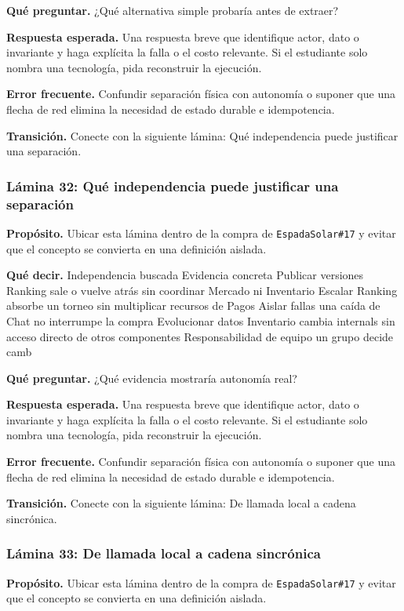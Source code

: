\documentclass[variant=docente,cover=institutional,mode=screen]{ua-engineering-v6-article}
\begin{document}
\textbf{Qué preguntar.} ¿Qué alternativa simple probaría antes de extraer?

\textbf{Respuesta esperada.} Una respuesta breve que identifique actor, dato o invariante y haga explícita la falla o el costo relevante. Si el estudiante solo nombra una tecnología, pida reconstruir la ejecución.

\textbf{Error frecuente.} Confundir separación física con autonomía o suponer que una flecha de red elimina la necesidad de estado durable e idempotencia.

\textbf{Transición.} Conecte con la siguiente lámina: Qué independencia puede justificar una separación.

\subsubsection*{Lámina 32: Qué independencia puede justificar una separación}
\textbf{Propósito.} Ubicar esta lámina dentro de la compra de \texttt{EspadaSolar\#17} y evitar que el concepto se convierta en una definición aislada.

\textbf{Qué decir.} Independencia buscada Evidencia concreta Publicar versiones Ranking sale o vuelve atrás sin coordinar Mercado ni Inventario Escalar Ranking absorbe un torneo sin multiplicar recursos de Pagos Aislar fallas una caída de Chat no interrumpe la compra Evolucionar datos Inventario cambia internals sin acceso directo de otros componentes Responsabilidad de equipo un grupo decide camb

\textbf{Qué preguntar.} ¿Qué evidencia mostraría autonomía real?

\textbf{Respuesta esperada.} Una respuesta breve que identifique actor, dato o invariante y haga explícita la falla o el costo relevante. Si el estudiante solo nombra una tecnología, pida reconstruir la ejecución.

\textbf{Error frecuente.} Confundir separación física con autonomía o suponer que una flecha de red elimina la necesidad de estado durable e idempotencia.

\textbf{Transición.} Conecte con la siguiente lámina: De llamada local a cadena sincrónica.

\subsubsection*{Lámina 33: De llamada local a cadena sincrónica}
\textbf{Propósito.} Ubicar esta lámina dentro de la compra de \texttt{EspadaSolar\#17} y evitar que el concepto se convierta en una definición aislada.
\end{document}
